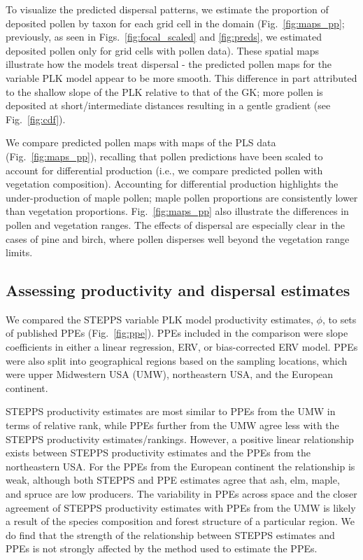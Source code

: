 \documentclass[12pt]{article}
\begin{document}
To visualize the predicted dispersal patterns, we estimate the
proportion of deposited pollen by taxon for each grid cell in the
domain (Fig.~\ref{fig:maps_pp}; previously, as seen in
Figs.~\ref{fig:focal_scaled} and \ref{fig:preds}, we estimated
deposited pollen only for grid cells with pollen data). These spatial
maps illustrate how the models treat dispersal - the predicted pollen
maps for the variable PLK model appear to be more smooth. This
difference in part attributed to the shallow slope of the PLK relative
to that of the GK; more pollen is deposited at short/intermediate
distances resulting in a gentle gradient (see Fig.~\ref{fig:cdf}).

We compare predicted pollen maps with maps of the PLS data
(Fig.~\ref{fig:maps_pp}), recalling that pollen predictions have
been scaled to account for differential production (i.e., we compare
predicted pollen with vegetation composition). Accounting for
differential production highlights the under-production of maple
pollen; maple pollen proportions are consistently lower than
vegetation proportions. Fig.~\ref{fig:maps_pp} also illustrate the
differences in pollen and vegetation ranges. The effects of dispersal
are especially clear in the cases of pine and birch, where pollen
disperses well beyond the vegetation range limits.

\subsection{Assessing productivity and dispersal estimates}

We compared the STEPPS variable PLK model productivity estimates,
$\phi$, to sets of published PPEs (Fig.~\ref{fig:ppe}). PPEs included
in the comparison were slope coefficients in either a linear
regression, ERV, or bias-corrected ERV model.  PPEs were also split
into geographical regions based on the sampling locations, which were
upper Midwestern USA (UMW), northeastern USA, and the European
continent.

 STEPPS productivity estimates are most similar to PPEs from the UMW
 in terms of relative rank, while PPEs further from the UMW agree less
 with the STEPPS productivity estimates/rankings.  However, a positive
 linear relationship exists between STEPPS productivity estimates and
 the PPEs from the northeastern USA. For the PPEs from the European
 continent the relationship is weak, although both STEPPS and PPE
 estimates agree that ash, elm, maple, and spruce are low
 producers. The variability in PPEs across space and the closer
 agreement of STEPPS productivity estimates with PPEs from the UMW is
 likely a result of the species composition and forest structure of a
 particular region. We do find that the strength of the relationship
 between STEPPS estimates and PPEs is not strongly affected by the
 method used to estimate the PPEs.
\end{document}
